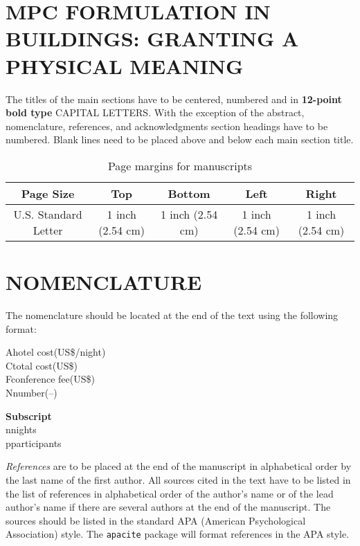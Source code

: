 \documentclass[10pt]{extarticle}
\begin{document}
\section{MPC FORMULATION IN BUILDINGS: GRANTING A PHYSICAL MEANING }

The titles of the main sections have to be centered, numbered and in \textbf{12-point bold type} CAPITAL LETTERS.  With the exception of the abstract, nomenclature, references, and acknowledgments section headings have to be numbered. Blank lines need to be placed above and below each main section title.

\begin{table}[b]
\centering
\caption{Page margins for manuscripts}
\begin{tabular}{ccccc}
\toprule
\textbf{Page Size} & \textbf{Top} & \textbf{Bottom} & \textbf{Left} & \textbf{Right} \\ 
\midrule 
U.S. Standard Letter & 1 inch (2.54 cm) & 1 inch (2.54 cm) & 1 inch (2.54 cm) & 1 inch (2.54 cm) \\ 
\bottomrule 
\end{tabular}
\end{table} 


\section*{NOMENCLATURE}

The nomenclature should be located at the end of the text using the following format:\\
\begin{samepage}
A\tabto{1.0in}hotel cost\tabto{2.5in}(US\$/night)	\\
C\tabto{1.0in}total cost\tabto{2.5in}(US\$)	\\
F\tabto{1.0in}conference fee\tabto{2.5in}(US\$)\\	
N\tabto{1.0in}number\tabto{2.5in}(–)

\end{samepage}
\begin{samepage}
\textbf{Subscript}\\
n\tabto{1.0in}nights	\\
p\tabto{1.0in}participants
\end{samepage}



\vspace{24pt}
\emph{References} are to be placed at the end of the manuscript in alphabetical order by the last name of the first author.  All sources cited in the text have to be listed in the list of references in alphabetical order of the author's name or of the lead author's name if there are several authors at the end of the manuscript.  The sources should be listed in the standard APA (American Psychological Association) style.  The \texttt{apacite} package will format references in the APA style. 
\end{document}
